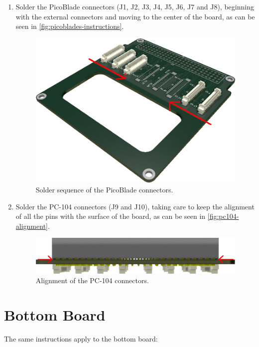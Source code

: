\begin{enumerate}
    \item Solder the PicoBlade connectors (J1, J2, J3, J4, J5, J6, J7 and J8), beginning with the external connectors and moving to the center of the board, as can be seen in \autoref{fig:picoblades-instructions}.

\begin{figure}[!htb]
    \begin{center}
        \includegraphics[width=0.6\columnwidth]{figures/picoblade-solder}
        \caption{Solder sequence of the PicoBlade connectors.}
        \label{fig:picoblades-instructions}
    \end{center}
\end{figure}

    \item Solder the PC-104 connectors (J9 and J10), taking care to keep the alignment of all the pins with the surface of the board, as can be seen in \autoref{fig:pc104-alignment}.

\begin{figure}[!htb]
    \begin{center}
        \includegraphics[width=0.7\columnwidth]{figures/pc104-alignment}
        \caption{Alignment of the PC-104 connectors.}
        \label{fig:pc104-alignment}
    \end{center}
\end{figure}
\end{enumerate}

\section{Bottom Board}

The same instructions apply to the bottom board:

